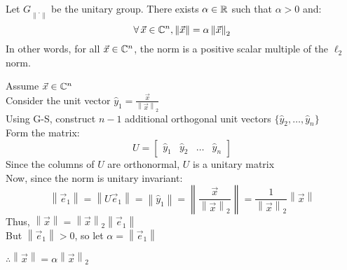 \documentclass[letterpaper,12pt,fleqn]{article}
\newcommand{\norm}[1]{\left\lVert#1\right\rVert}
\newcommand{\vx}{\vec{x}}
\newcommand{\hy}{\hat{y}}
\newcommand{\ve}{\vec{e}}
\renewcommand{\a}{\alpha}
\newcommand{\ig}{G_{\norm{\cdot}}}
\begin{document}
\begin{theorem}
  Let $\ig$ be the unitary group. There exists $\a\in\R$ such that $\a>0$ and:
  \[\forall\,\vx\in\C^n,\norm{\vx}=\a\norm{\vx}_2\]
  In other words, for all $\vx\in\C^n$, the norm is a positive scalar multiple
  of the $\ell_2$ norm.
\end{theorem}

\begin{theproof}
  Assume $\vx\in\C^n$ \\
  Consider the unit vector $\hy_1=\frac{\vx}{\norm{\vx}_2}$ \\
  Using G-S, construct $n-1$ additional orthogonal unit vectors
  $\{\hy_2,\ldots,\hy_n\}$ \\
  Form the matrix:
  \[U=\begin{bmatrix} \hy_1 & \hy_2 & \ldots & \hy_n \end{bmatrix}\]
  Since the columns of $U$ are orthonormal, $U$ is a unitary matrix \\
  Now, since the norm is unitary invariant:
  \[\norm{\ve_1}=\norm{U\ve_1}=\norm{\hy_1}=\norm{\frac{\vx}{\norm{\vx}_2}}=
  \frac{1}{\norm{\vx}_2}\norm{\vx}\]
  Thus, $\norm{\vx}=\norm{\vx}_2\norm{\ve_1}$ \\
  But $\norm{\ve_1}>0$, so let $\a=\norm{\ve_1}$
    
  $\therefore\norm{\vx}=\a\norm{\vx}_2$
\end{theproof}
\end{document}
